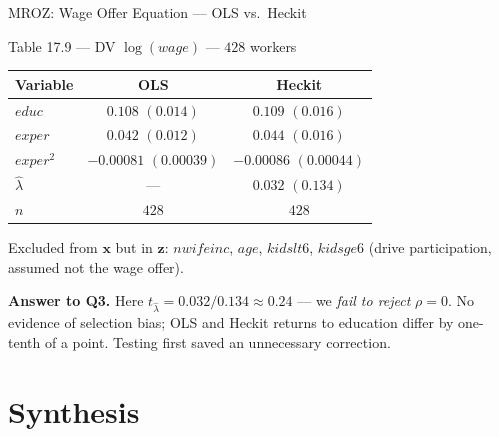 \documentclass[aspectratio=169, 12pt]{beamer}
\begin{document}
\begin{frame}[shrink=12]{MROZ: Wage Offer Equation --- OLS vs.\ Heckit}

  \begin{examplebox}{Table 17.9 --- DV $\log(wage)$ --- $428$ workers}
    \centering\footnotesize
    \begin{tabular}{l c c}
      \toprule
      Variable & OLS & Heckit \\
      \midrule
      $educ$    & $0.108$ $(0.014)$ & $0.109$ $(0.016)$ \\
      $exper$   & $0.042$ $(0.012)$ & $0.044$ $(0.016)$ \\
      $exper^2$ & $-0.00081$ $(0.00039)$ & $-0.00086$ $(0.00044)$ \\
      $\hat\lambda$ & --- & $0.032$ $(0.134)$ \\
      \midrule
      $n$ & $428$ & $428$ \\
      \bottomrule
    \end{tabular}
  \end{examplebox}

  \begin{highlightbox}
    \small
    Excluded from $\mathbf{x}$ but in $\mathbf{z}$: $nwifeinc$, $age$, $kidslt6$,
    $kidsge6$ (drive participation, assumed not the wage offer).

    \smallskip
    \textbf{Answer to Q3.} Here $t_{\hat\lambda}=0.032/0.134 \approx 0.24$ --- we
    \emph{fail to reject} $\rho=0$. No evidence of selection bias; OLS and Heckit
    returns to education differ by one-tenth of a point. Testing first saved an
    unnecessary correction.
  \end{highlightbox}

\end{frame}

\section{Synthesis}
\end{document}
